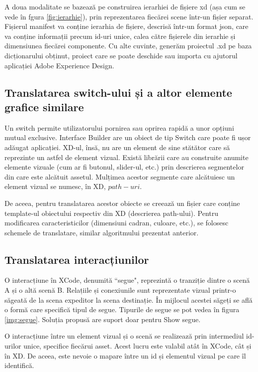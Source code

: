 A doua modalitate se bazează pe construirea ierarhiei de fișiere xd (așa cum se vede în fgura \ref{fig:ierarhie}), prin reprezentarea fiecărei scene într-un fișier separat. Fișierul manifest va conține ierarhia de fișiere, descrisă într-un format json, care va conține informații precum id-uri unice, calea către fișierele din ierarhie și dimensiunea fiecărei componente. Cu alte cuvinte, generăm proiectul .xd pe baza dicționarului obținut, proiect care se poate deschide sau importa cu ajutorul aplicației Adobe Experience Design.

\subsection{Translatarea switch-ului și a altor elemente grafice similare}

Un switch permite utilizatorului pornirea sau oprirea rapidă a unor opțiuni mutual exclusive. 
Interface Builder are un obiect de tip Switch care poate fi ușor adăugat aplicației. XD-ul, însă, nu are un element de sine stătător care să reprezinte un astfel de element vizual. Există librării care au construite anumite elemente vizuale (cum ar fi butonul, slider-ul, etc.) prin descrierea segmentelor din care este alcătuit assetul. Mulțimea acestor segmente care alcătuiesc un element vizual se numesc, în XD, $path-uri$.

De aceea, pentru translatarea acestor obiecte se creează un fișier care conține template-ul obiectului respectiv din XD (descrierea path-ului). Pentru modificarea caracteristicilor (dimensiuni cadran, culoare, etc.), se folosesc schemele de translatare, similar algoritmului prezentat anterior.

\subsection{Translatarea interacțiunilor}

O interacțiune în XCode, denumită ``segue", reprezintă o tranziție dintre o scenă A și o altă scenă B. Relațiile și conexiunile sunt reprezentate vizual printr-o săgeată de la scena expeditor la scena destinație. În mijlocul acestei săgeți se află o formă care specifică tipul de segue. Tipurile de segue se pot vedea în figura \ref{img:segue}. Soluția propusă are suport doar pentru Show segue.


O interacțiune între un element vizual și o scenă se realizează prin intermediul id-urilor unice, specifice fiecărui asset. Acest lucru este valabil atât în XCode, cât și în XD. De aceea, este nevoie o mapare între un id și elementul vizual pe care îl identifică. 

